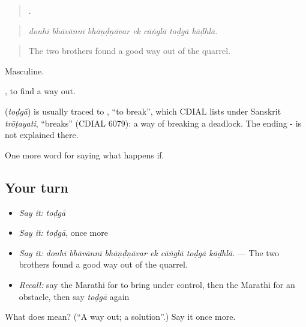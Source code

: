 \begin{quote}
      .
\end{quote}

\begin{quote}
\emph{donhī bhāvānnī bhāṇḍṇāvar ek cāṅglā toḍgā kāḍhlā.}
\end{quote}

\begin{quote}
The two brothers found a good way out of the quarrel.
\end{quote}

Masculine.

 , to find a way out.

\begin{cousinweb}
\textbf{} (\emph{toḍgā}) is usually traced to , \textquotedblleft{}to break\textquotedblright{}, which CDIAL lists under Sanskrit \emph{trōṭayati}, \textquotedblleft{}breaks\textquotedblright{} (CDIAL 6079): a way of breaking a deadlock. The ending - is not explained there.
\end{cousinweb}

\begin{grammarlens}[title={What you've built}]
One more word for saying what happens if.
\end{grammarlens}

\subsection*{Your turn}
\begin{itemize}
\raggedright
  \item \emph{Say it:} \emph{toḍgā}
  \item \emph{Say it:} \emph{toḍgā}, once more
  \item \emph{Say it:} \emph{donhī bhāvānnī bhāṇḍṇāvar ek cāṅglā toḍgā kāḍhlā.} — The two brothers found a good way out of the quarrel.
  \item \emph{Recall:} say the Marathi for to bring under control, then the Marathi for an obstacle, then say \emph{toḍgā} again
\end{itemize}

\begin{tcolorbox}[breakable,colback=teal!4,colframe=teal!35!black,title={Before you move on}]
What does  mean? (\textquotedblleft{}A way out; a solution\textquotedblright{}.) Say it once more.
\end{tcolorbox}
